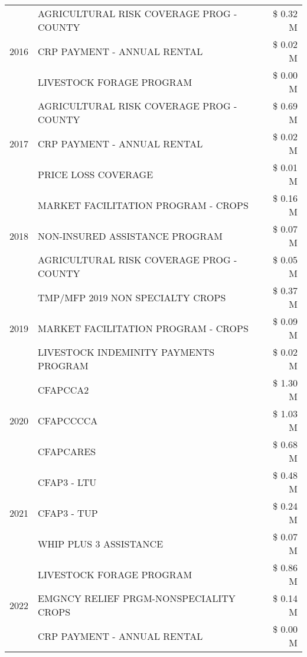 \begin{tabular}{llr}
\cline{1-3}
\multirow[t]{3}{*}{2016} & AGRICULTURAL RISK COVERAGE PROG - COUNTY & \$ 0.32 M \\
 & CRP PAYMENT - ANNUAL RENTAL & \$ 0.02 M \\
 & LIVESTOCK FORAGE PROGRAM & \$ 0.00 M \\
\cline{1-3}
\multirow[t]{3}{*}{2017} & AGRICULTURAL RISK COVERAGE PROG - COUNTY & \$ 0.69 M \\
 & CRP PAYMENT - ANNUAL RENTAL & \$ 0.02 M \\
 & PRICE LOSS COVERAGE & \$ 0.01 M \\
\cline{1-3}
\multirow[t]{3}{*}{2018} & MARKET FACILITATION PROGRAM - CROPS & \$ 0.16 M \\
 & NON-INSURED ASSISTANCE PROGRAM & \$ 0.07 M \\
 & AGRICULTURAL RISK COVERAGE PROG - COUNTY & \$ 0.05 M \\
\cline{1-3}
\multirow[t]{3}{*}{2019} & TMP/MFP 2019 NON SPECIALTY CROPS & \$ 0.37 M \\
 & MARKET FACILITATION PROGRAM - CROPS & \$ 0.09 M \\
 & LIVESTOCK INDEMINITY PAYMENTS PROGRAM & \$ 0.02 M \\
\cline{1-3}
\multirow[t]{3}{*}{2020} & CFAPCCA2 & \$ 1.30 M \\
 & CFAPCCCCA & \$ 1.03 M \\
 & CFAPCARES & \$ 0.68 M \\
\cline{1-3}
\multirow[t]{3}{*}{2021} & CFAP3 - LTU & \$ 0.48 M \\
 & CFAP3 - TUP & \$ 0.24 M \\
 & WHIP PLUS 3 ASSISTANCE & \$ 0.07 M \\
\cline{1-3}
\multirow[t]{3}{*}{2022} & LIVESTOCK FORAGE PROGRAM & \$ 0.86 M \\
 & EMGNCY RELIEF PRGM-NONSPECIALITY CROPS & \$ 0.14 M \\
 & CRP PAYMENT - ANNUAL RENTAL & \$ 0.00 M \\
\cline{1-3}
\bottomrule
\end{tabular}
